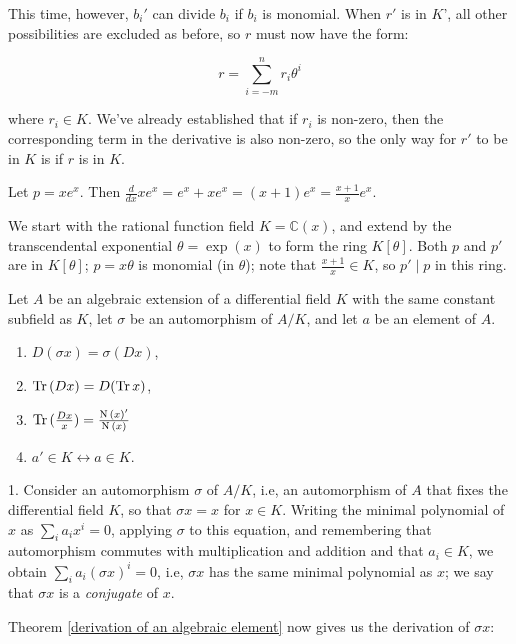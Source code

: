 This time, however, $b_i'$ can divide $b_i$ if $b_i$ is monomial.
When $r'$ is in $K$', all other possibilities are excluded as before,
so $r$ must now have the form:

$$r = \sum_{i=-m}^n r_i \theta^i$$

where $r_i \in K$.  We've already established that if $r_i$ is
non-zero, then the corresponding term in the derivative
is also non-zero, so the only way for $r'$ to be in $K$ is if
$r$ is in $K$.

\endtheorem

\example Let $p = x e^x$.  Then
$\frac{d}{dx} x e^x = e^x + x e^x = (x+1) e^x = \frac{x+1}{x} e^x$.

We start with the rational function field $K = {\mathbb C}(x)$, and
extend by the transcendental exponential $\theta = \exp(x)$ to form
the ring $K[\theta]$.  Both $p$ and $p'$ are in $K[\theta]$;
$p=x\theta$ is monomial (in $\theta$); note that $\frac{x+1}{x} \in
K$, so $p' \mid p$ in this ring.

\endexample

\theorem\label{basic algebraic properties}

Let $A$ be an algebraic extension of a differential field $K$ with the
same constant subfield as $K$, let $\sigma$ be an automorphism of
$A/K$, and let $a$ be an element of $A$.

\begin{enumerate}
\item $D(\sigma x) = \sigma(D x)$,
\item ${\rm Tr\,}(D x) = D({\rm Tr\,} x)$,
\item ${\rm Tr\,}(\frac{D x}{x}) = \frac{{\rm N\,}(x)'}{{\rm N\,}(x)}$
\item $a' \in K \leftrightarrow a \in K$.
\end{enumerate}

\proof

1. Consider an automorphism $\sigma$ of $A/K$, i.e, an automorphism of $A$
that fixes the differential field $K$, so that $\sigma x = x$ for
$x \in K$.  Writing the minimal polynomial of $x$ as $\sum_i a_i x^i =
0$, applying $\sigma$ to this equation, and remembering that
automorphism commutes with multiplication and addition and that
$a_i \in K$, we obtain $\sum_i a_i (\sigma x)^i = 0$, i.e, $\sigma x$
has the same minimal polynomial as $x$; we say that $\sigma x$
is a {\it conjugate} of $x$.

Theorem \ref{derivation of an algebraic element} now gives us the derivation of $\sigma x$:

